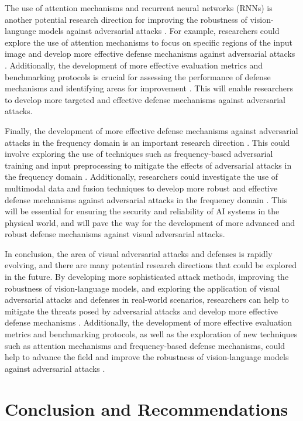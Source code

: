 \documentclass[11pt]{article}
\begin{document}
The use of attention mechanisms and recurrent neural networks (RNNs) is another potential research direction for improving the robustness of vision-language models against adversarial attacks \cite{ref145}. For example, researchers could explore the use of attention mechanisms to focus on specific regions of the input image and develop more effective defense mechanisms against adversarial attacks \cite{ref133}. Additionally, the development of more effective evaluation metrics and benchmarking protocols is crucial for assessing the performance of defense mechanisms and identifying areas for improvement \cite{ref141}. This will enable researchers to develop more targeted and effective defense mechanisms against adversarial attacks.

Finally, the development of more effective defense mechanisms against adversarial attacks in the frequency domain is an important research direction \cite{ref146}. This could involve exploring the use of techniques such as frequency-based adversarial training and input preprocessing to mitigate the effects of adversarial attacks in the frequency domain \cite{ref147}. Additionally, researchers could investigate the use of multimodal data and fusion techniques to develop more robust and effective defense mechanisms against adversarial attacks in the frequency domain \cite{ref144}. This will be essential for ensuring the security and reliability of AI systems in the physical world, and will pave the way for the development of more advanced and robust defense mechanisms against visual adversarial attacks.

In conclusion, the area of visual adversarial attacks and defenses is rapidly evolving, and there are many potential research directions that could be explored in the future. By developing more sophisticated attack methods, improving the robustness of vision-language models, and exploring the application of visual adversarial attacks and defenses in real-world scenarios, researchers can help to mitigate the threats posed by adversarial attacks and develop more effective defense mechanisms \cite{ref148}. Additionally, the development of more effective evaluation metrics and benchmarking protocols, as well as the exploration of new techniques such as attention mechanisms and frequency-based defense mechanisms, could help to advance the field and improve the robustness of vision-language models against adversarial attacks \cite{ref149}.

\section{Conclusion and Recommendations}
\end{document}
